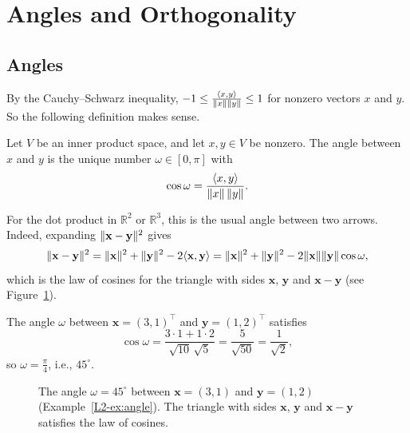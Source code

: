 \section{Angles and Orthogonality}

\subsection{Angles}

By the Cauchy--Schwarz inequality, $-1 \leq \frac{\langle x, y \rangle}{\lVert x \rVert \lVert y \rVert} \leq 1$ for nonzero vectors $x$ and $y$. So the following definition makes sense.

\begin{definition}[Angle]
    Let $V$ be an inner product space, and let $x, y \in V$ be nonzero. The angle between $x$ and $y$ is the unique number $\omega \in [0, \pi]$ with
    \[\cos \omega = \frac{\langle x, y \rangle}{\lVert x \rVert \, \lVert y \rVert}.\]
\end{definition}

For the dot product in $\mathbb{R}^2$ or $\mathbb{R}^3$, this is the usual angle between two arrows. Indeed, expanding $\lVert \mathbf{x} - \mathbf{y} \rVert^2$ gives
\[\lVert \mathbf{x} - \mathbf{y} \rVert^2 = \lVert \mathbf{x} \rVert^2 + \lVert \mathbf{y} \rVert^2 - 2 \langle \mathbf{x}, \mathbf{y} \rangle = \lVert \mathbf{x} \rVert^2 + \lVert \mathbf{y} \rVert^2 - 2 \lVert \mathbf{x} \rVert \lVert \mathbf{y} \rVert \cos\omega,\]
which is the law of cosines for the triangle with sides $\mathbf{x}$, $\mathbf{y}$ and $\mathbf{x} - \mathbf{y}$ (see Figure~\ref{L2-fig:angle}).

\begin{example}\label{L2-ex:angle}
    The angle $\omega$ between $\mathbf{x} = (3, 1)^\top$ and $\mathbf{y} = (1, 2)^\top$ satisfies
    \[\cos\omega = \frac{3 \cdot 1 + 1 \cdot 2}{\sqrt{10} \, \sqrt{5}} = \frac{5}{\sqrt{50}} = \frac{1}{\sqrt{2}},\]
    so $\omega = \frac{\pi}{4}$, i.e., $45^\circ$.
\end{example}

\begin{figure}[ht]
    \centering
    \caption[The angle between two vectors]{The angle $\omega = 45^\circ$ between $\mathbf{x} = (3, 1)$ and $\mathbf{y} = (1, 2)$ (Example~\ref{L2-ex:angle}). The triangle with sides $\mathbf{x}$, $\mathbf{y}$ and $\mathbf{x} - \mathbf{y}$ satisfies the law of cosines.}
    \label{L2-fig:angle}
\end{figure}

